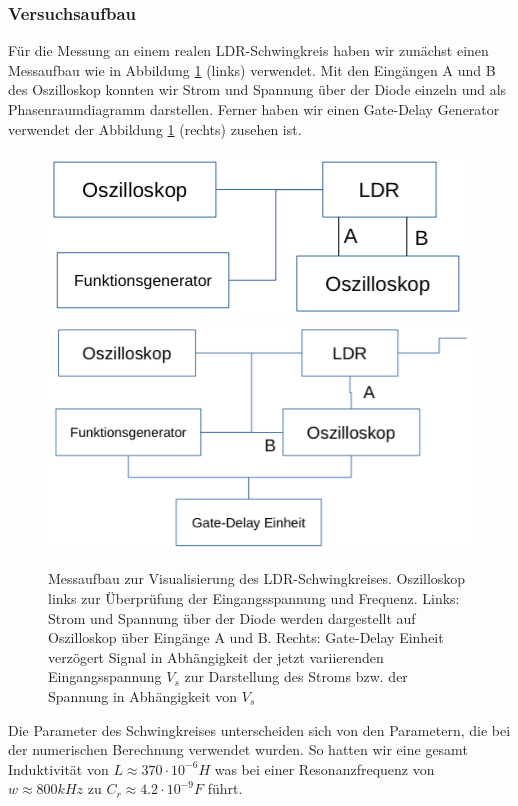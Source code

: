 \documentclass[12pt,a4paper]{article}
\begin{document}
\subsubsection{ Versuchsaufbau}
Für die Messung an einem realen LDR-Schwingkreis haben wir zunächst einen Messaufbau wie in Abbildung \ref{fig:ldr-aufbau1} (links) verwendet. Mit den Eingängen A und B des Oszilloskop konnten wir Strom und Spannung über der Diode einzeln und als Phasenraumdiagramm darstellen. Ferner haben wir einen Gate-Delay Generator verwendet der Abbildung \ref{fig:ldr-aufbau1} (rechts) zusehen ist.
\begin{figure}[!htbp]
\includegraphics[scale=0.4]{aufbau1}
\includegraphics[scale=0.38]{aufbau2}
\caption{Messaufbau zur Visualisierung des LDR-Schwingkreises. Oszilloskop links zur Überprüfung der Eingangsspannung und Frequenz. Links: Strom und Spannung über der Diode werden dargestellt auf Oszilloskop über Eingänge A und B. Rechts: Gate-Delay Einheit verzögert Signal in Abhängigkeit der jetzt variierenden Eingangsspannung $V_s$ zur Darstellung des Stroms bzw. der Spannung in Abhängigkeit von $V_s$ }
\label{fig:ldr-aufbau1}
\end{figure}
Die Parameter des Schwingkreises unterscheiden sich von den Parametern, die bei der numerischen Berechnung verwendet wurden. So hatten wir eine gesamt Induktivität von $L\approx370\cdot10^{-6}H$ was bei einer Resonanzfrequenz von $w\approx800kHz$ zu $C_r\approx4.2\cdot10^{-9}F$ führt.
\end{document}

